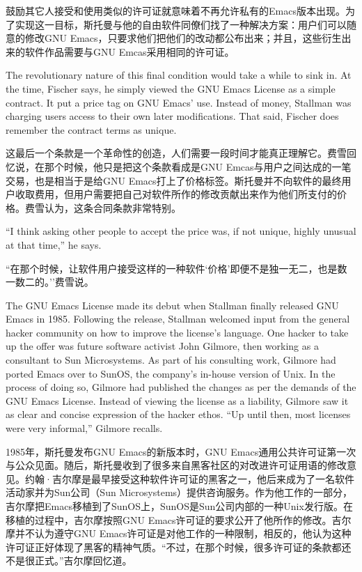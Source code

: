 \ifdefined\chs
鼓励其它人接受和使用类似的许可证就意味着不再允许私有的Emacs版本出现。为了实现这一目标，斯托曼与他的自由软件同僚们找了一种解决方案：用户们可以随意的修改GNU Emacs，只要求他们把他们的改动都公布出来；并且，这些衍生出来的软件作品需要与GNU Emcas采用相同的许可证。
\fi

\ifdefined\eng
The revolutionary nature of this final condition would take a while to sink in. At the time, Fischer says, he simply viewed the GNU Emacs License as a simple contract. It put a price tag on GNU Emacs' use. Instead of money, Stallman was charging users access to their own later modifications. That said, Fischer does remember the contract terms as unique.
\fi

\ifdefined\chs
这最后一个条款是一个革命性的创造，人们需要一段时间才能真正理解它。费雪回忆说，在那个时候，他只是把这个条款看成是GNU Emcas与用户之间达成的一笔交易，也是相当于是给GNU Emacs打上了价格标签。斯托曼并不向软件的最终用户收取费用，但用户需要把自己对软件所作的修改贡献出来作为他们所支付的价格。费雪认为，这条合同条款非常特别。
\fi

\ifdefined\eng
``I think asking other people to accept the price was, if not unique, highly unusual at that time,'' he says.
\fi

\ifdefined\chs
``在那个时候，让软件用户接受这样的一种软件`价格'即便不是独一无二，也是数一数二的。''费雪说。
\fi

\ifdefined\eng
The GNU Emacs License made its debut when Stallman finally released GNU Emacs in 1985. Following the release, Stallman welcomed input from the general hacker community on how to improve the license's language. One hacker to take up the offer was future software activist John Gilmore, then working as a consultant to Sun Microsystems. As part of his consulting work, Gilmore had ported Emacs over to SunOS, the company's in-house version of Unix. In the process of doing so, Gilmore had published the changes as per the demands of the GNU Emacs License. Instead of viewing the license as a liability, Gilmore saw it as clear and concise expression of the hacker ethos. ``Up until then, most licenses were very informal,'' Gilmore recalls.
\fi

\ifdefined\chs
1985年，斯托曼发布GNU Emacs的新版本时，GNU Emacs通用公共许可证第一次与公众见面。随后，斯托曼收到了很多来自黑客社区的对改进许可证用语的修改意见。约翰·吉尔摩是最早接受这种软件许可证的黑客之一，他后来成为了一名软件活动家并为Sun公司（Sun Microsystems）提供咨询服务。作为他工作的一部分，吉尔摩把Emacs移植到了SunOS上，SunOS是Sun公司内部的一种Unix发行版。在移植的过程中，吉尔摩按照GNU Emacs许可证的要求公开了他所作的修改。吉尔摩并不认为遵守GNU Emacs许可证是对他工作的一种限制，相反的，他认为这种许可证正好体现了黑客的精神气质。``不过，在那个时候，很多许可证的条款都还不是很正式。''吉尔摩回忆道。
\fi

